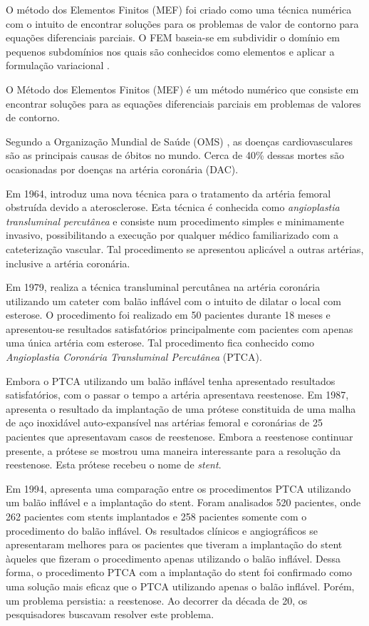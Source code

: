 O método dos Elementos Finitos (MEF) foi criado como uma técnica
numérica com o intuito de encontrar soluções para os
problemas de valor de contorno para equações diferenciais
parciais. O FEM baseia-se em subdividir o domínio em pequenos
subdomínios nos quais são conhecidos como elementos e aplicar
a formulação variacional . 


O Método dos Elementos Finitos (MEF) é um método numérico
que consiste em encontrar soluções para as equações diferenciais 
parciais em problemas de valores de contorno. 

Segundo a Organização Mundial de Saúde (OMS) \cite{oms},
as doenças cardiovasculares são as principais
causas de óbitos no mundo. Cerca de 40\% dessas
mortes são ocasionadas por doenças na artéria
coronária (DAC). 

\medskip
Em 1964, \cite{dotter1964} introduz uma nova técnica para o tratamento
da artéria femoral obstruída devido a aterosclerose. Esta técnica é
conhecida como \textit{angioplastia transluminal percutânea} e consiste num
procedimento simples e minimamente invasivo, possibilitando a execução por qualquer 
médico familiarizado com a cateterização vascular. Tal procedimento se apresentou 
aplicável a outras artérias, inclusive a artéria coronária.

\medskip
Em 1979, \cite{gruntzig1979} realiza a técnica transluminal percutânea na artéria
coronária utilizando um cateter com balão inflável com o intuito de dilatar o local
com esterose. O procedimento foi realizado em 50 pacientes durante 18 meses e
apresentou-se resultados satisfatórios principalmente com pacientes com apenas
uma única artéria com esterose. Tal procedimento fica conhecido como \textit{Angioplastia Coronária
Transluminal Percutânea} (PTCA). 

\medskip
Embora o PTCA utilizando um balão inflável tenha apresentado resultados satisfatórios,
com o passar o tempo a artéria apresentava reestenose. Em 1987, \cite{sigwart1987}
apresenta o resultado da implantação de uma prótese constituida de uma malha de aço 
inoxidável auto-expansível nas artérias femoral e coronárias de 25 pacientes que apresentavam 
casos de reestenose. Embora a reestenose continuar presente, a prótese se mostrou uma
maneira interessante para a resolução da reestenose. Esta prótese recebeu o nome de \textit{stent}.

\medskip
Em 1994, \cite{serruys1994} apresenta uma comparação entre os procedimentos PTCA 
utilizando um balão inflável e a implantação do stent. Foram analisados 520 pacientes,
onde 262 pacientes com stents implantados e 258 pacientes somente com o procedimento do
balão inflável. Os resultados clínicos e angiográficos se apresentaram melhores para os
pacientes que tiveram a implantação do stent àqueles que fizeram o procedimento apenas
utilizando o balão inflável. Dessa forma, o procedimento PTCA com a implantação do stent
foi confirmado como uma solução mais eficaz que o PTCA utilizando apenas o balão inflável. 
Porém, um problema persistia: a reestenose. Ao decorrer da década de 20, os pesquisadores 
buscavam resolver este problema.

